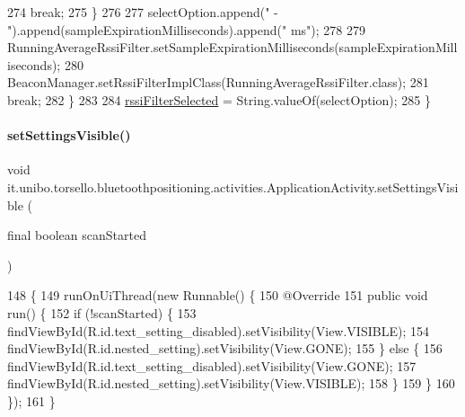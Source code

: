 \begin{DoxyCode}
274                         \textcolor{keywordflow}{break};
275                 \}
276 
277                 selectOption.append(\textcolor{stringliteral}{" - "}).append(sampleExpirationMilliseconds).append(\textcolor{stringliteral}{" ms"});
278 
279                 RunningAverageRssiFilter.setSampleExpirationMilliseconds(sampleExpirationMilliseconds);
280                 BeaconManager.setRssiFilterImplClass(RunningAverageRssiFilter.class);
281                 \textcolor{keywordflow}{break};
282         \}
283 
284         \hyperlink{classit_1_1unibo_1_1torsello_1_1bluetoothpositioning_1_1activities_1_1ApplicationActivity_aa0775c805f735289a7fc6c380ff81fca_aa0775c805f735289a7fc6c380ff81fca}{rssiFilterSelected} = String.valueOf(selectOption);
285     \}
\end{DoxyCode}
\hypertarget{classit_1_1unibo_1_1torsello_1_1bluetoothpositioning_1_1activities_1_1ApplicationActivity_a53d1d26ad17526c6c518c4d8b4db3a8e_a53d1d26ad17526c6c518c4d8b4db3a8e}{}\label{classit_1_1unibo_1_1torsello_1_1bluetoothpositioning_1_1activities_1_1ApplicationActivity_a53d1d26ad17526c6c518c4d8b4db3a8e_a53d1d26ad17526c6c518c4d8b4db3a8e} 
\paragraph{\texorpdfstring{set\+Settings\+Visible()}{setSettingsVisible()}}
{\footnotesize\ttfamily void it.\+unibo.\+torsello.\+bluetoothpositioning.\+activities.\+Application\+Activity.\+set\+Settings\+Visible (\begin{DoxyParamCaption}\item[{final boolean}]{scan\+Started }\end{DoxyParamCaption})\hspace{0.3cm}{\ttfamily [private]}}


\begin{DoxyCode}
148                                                                \{
149         runOnUiThread(\textcolor{keyword}{new} Runnable() \{
150             @Override
151             \textcolor{keyword}{public} \textcolor{keywordtype}{void} run() \{
152                 \textcolor{keywordflow}{if} (!scanStarted) \{
153                     findViewById(R.id.text\_setting\_disabled).setVisibility(View.VISIBLE);
154                     findViewById(R.id.nested\_setting).setVisibility(View.GONE);
155                 \} \textcolor{keywordflow}{else} \{
156                     findViewById(R.id.text\_setting\_disabled).setVisibility(View.GONE);
157                     findViewById(R.id.nested\_setting).setVisibility(View.VISIBLE);
158                 \}
159             \}
160         \});
161     \}
\end{DoxyCode}


